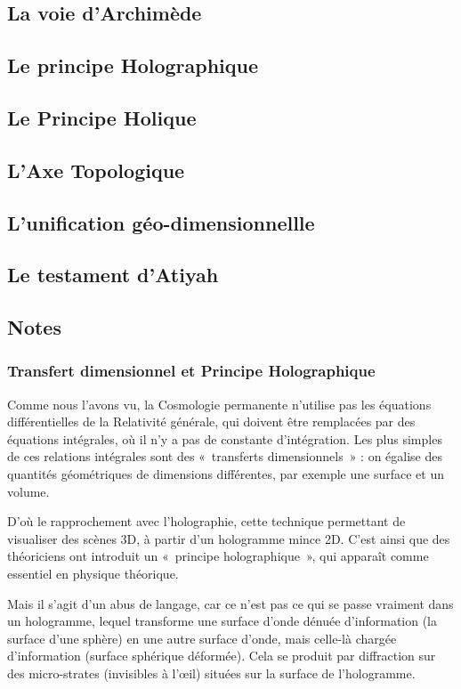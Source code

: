 \documentclass[a4paper,12pt]{article}
\begin{document}
\subsection{La voie d'Archimède}
\subsection{Le principe Holographique}
\subsection{Le Principe Holique}
\subsection{L'Axe Topologique}
\subsection{L'unification géo-dimensionnellle}
\subsection{Le testament d'Atiyah}




\subsection{Notes}
\subsubsection{Transfert dimensionnel et Principe Holographique }
 
Comme nous l'avons vu, la Cosmologie permanente n'utilise pas les équations différentielles de la Relativité générale, qui doivent être remplacées par des équations intégrales, où il n'y a pas de constante d'intégration. Les plus simples de ces relations intégrales sont des « transferts dimensionnels » : on égalise des quantités géométriques de dimensions différentes, par exemple une surface et un volume.


D'où le rapprochement avec l'holographie, cette technique permettant de visualiser des scènes 3D, à partir d'un hologramme mince 2D. C'est ainsi que des théoriciens ont introduit un « principe holographique », qui apparaît comme essentiel en physique théorique.



Mais il s'agit d'un abus de langage, car ce n'est pas ce qui se passe vraiment dans un hologramme, lequel transforme une surface d'onde dénuée d'information (la surface d'une sphère) en une autre surface d'onde, mais celle-là chargée d'information (surface sphérique déformée). Cela se produit par diffraction sur des micro-strates (invisibles à l’œil) situées sur la surface de l'hologramme. 
\end{document}
